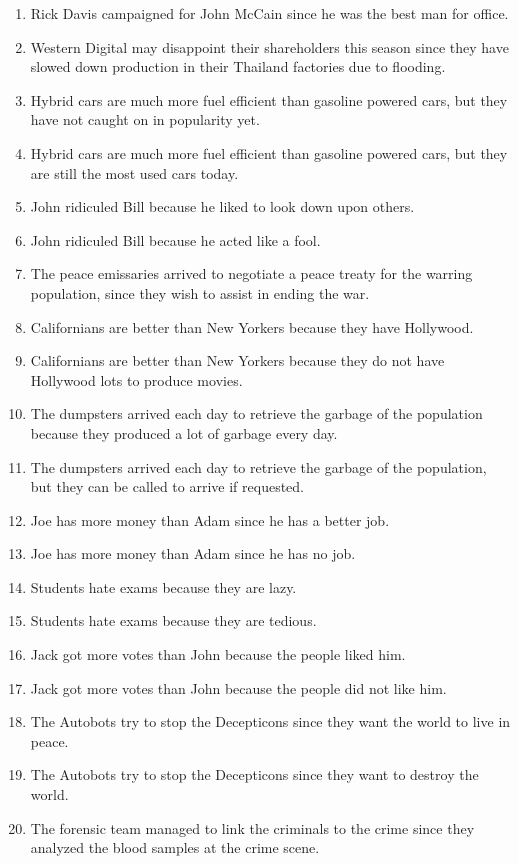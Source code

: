 \documentclass{article}
\begin{document}
\begin{enumerate}
	\item Rick Davis campaigned for John McCain since he was the best man for office.
	\item Western Digital may disappoint their shareholders this season since they have slowed down production in their Thailand factories due to flooding.
	\item Hybrid cars are much more fuel efficient than gasoline powered cars, but they have not caught on in popularity yet.
	\item Hybrid cars are much more fuel efficient than gasoline powered cars, but they are still the most used cars today.
	\item John ridiculed Bill because he liked to look down upon others.
	\item John ridiculed Bill because he acted like a fool.
	\item The peace emissaries arrived to negotiate a peace treaty for the warring population, since they wish to assist in ending the war.
	\item Californians are better than New Yorkers because they have Hollywood.
	\item Californians are better than New Yorkers because they do not have Hollywood lots to produce movies.
	\item The dumpsters arrived each day to retrieve the garbage of the population because they produced a lot of garbage every day.
	\item The dumpsters arrived each day to retrieve the garbage of the population, but they can be called to arrive if requested.
	\item Joe has more money than Adam since he has a better job.
	\item Joe has more money than Adam since he has no job.
	\item Students hate exams because they are lazy.
	\item Students hate exams because they are tedious.
	\item Jack got more votes than John because the people liked him.
	\item Jack got more votes than John because the people did not like him.
	\item The Autobots try to stop the Decepticons since they want the world to live in peace.
	\item The Autobots try to stop the Decepticons since they want to destroy the world.
	\item The forensic team managed to link the criminals to the crime since they analyzed the blood samples at the crime scene.

\end{enumerate}
\end{document}
